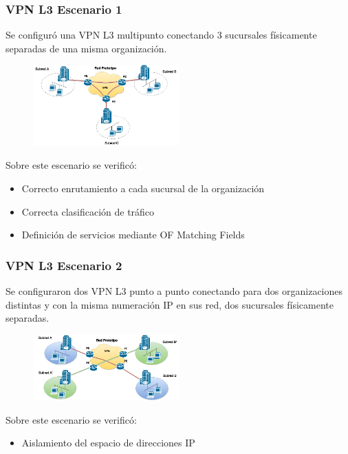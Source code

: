 \documentclass{beamer}
\begin{document}
\begin{frame}
\frametitle{VPN L3 Escenario 1} 

Se configur\'o una VPN L3 multipunto conectando 3 sucursales f\'isicamente separadas de una misma organizaci\'on.

\begin{figure}[H]
\centering
\includegraphics[width=0.5\textwidth]{imagenes/VPNMultipunto.png}
\end{figure}

Sobre este escenario se verific\'o:
\begin{itemize}
\item Correcto enrutamiento a cada sucursal de la organizaci\'on
\item Correcta clasificaci\'on de tr\'afico
\item Definici\'on de servicios mediante OF Matching Fields
\end{itemize}

\end{frame}

\begin{frame}
\frametitle{VPN L3 Escenario 2} 

Se configuraron dos VPN L3 punto a punto conectando para dos organizaciones distintas y con la misma numeraci\'on IP en sus red, dos sucursales f\'isicamente separadas. 

\begin{figure}[H]
\centering
\includegraphics[width=0.5\textwidth]{imagenes/VPNPPE1.png}
\end{figure}

Sobre este escenario se verific\'o:
\begin{itemize}
\item Aislamiento del espacio de direcciones IP
\end{itemize}


\end{frame}
\end{document}
